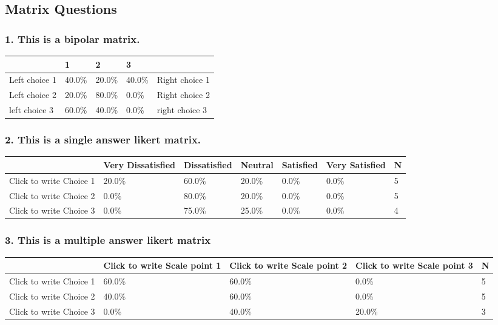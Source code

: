 \documentclass{article}\usepackage[]{graphicx}\usepackage[]{color}
\begin{document}
\subsection*{Matrix Questions}
\subsubsection*{1.
This is a bipolar matrix.}

\begin{tabular}{l|l|l|l|l}
\hline
 & 1 & 2 & 3 & \\
\hline
Left choice 1 & 40.0\% & 20.0\% & 40.0\% & Right choice 1\\
\hline
Left choice 2 & 20.0\% & 80.0\% & 0.0\% & Right choice 2\\
\hline
left choice 3 & 60.0\% & 40.0\% & 0.0\% & right choice 3\\
\hline
\end{tabular}


\hfill \break \hfill \break
\subsubsection*{2.
This is a single answer likert matrix.}

\begin{tabular}{l|l|l|l|l|l|l}
\hline
 & Very Dissatisfied & Dissatisfied  & Neutral & Satisfied & Very Satisfied & N\\
\hline
Click to write Choice 1 & 20.0\% & 60.0\% & 20.0\% & 0.0\% & 0.0\% & 5\\
\hline
Click to write Choice 2 & 0.0\% & 80.0\% & 20.0\% & 0.0\% & 0.0\% & 5\\
\hline
Click to write Choice 3 & 0.0\% & 75.0\% & 25.0\% & 0.0\% & 0.0\% & 4\\
\hline
\end{tabular}


\hfill \break \hfill \break
\subsubsection*{3.
This is a multiple answer likert matrix}

\begin{tabular}{l|l|l|l|l}
\hline
 & Click to write Scale point 1 & Click to write Scale point 2 & Click to write Scale point 3 & N\\
\hline
Click to write Choice 1 & 60.0\% & 60.0\% & 0.0\% & 5\\
\hline
Click to write Choice 2 & 40.0\% & 60.0\% & 0.0\% & 5\\
\hline
Click to write Choice 3 & 0.0\% & 40.0\% & 20.0\% & 3\\
\hline
\end{tabular}
\end{document}
